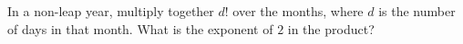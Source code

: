 In a non-leap year, multiply together $d!$ over the months, where $d$ is the number of days in that month. What is the exponent of $2$ in the product?
